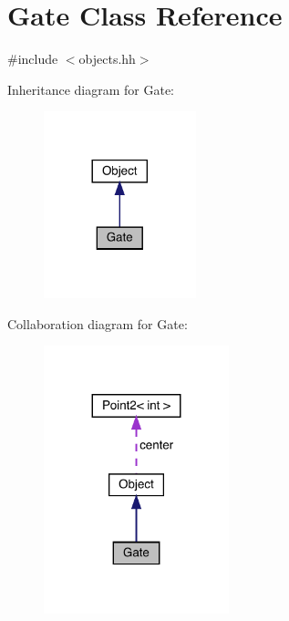 \hypertarget{class_gate}{}\section{Gate Class Reference}
\label{class_gate}


{\ttfamily \#include $<$objects.\+hh$>$}



Inheritance diagram for Gate\+:
\nopagebreak
\begin{figure}[H]
\begin{center}
\leavevmode
\includegraphics[width=125pt]{class_gate__inherit__graph}
\end{center}
\end{figure}


Collaboration diagram for Gate\+:
\nopagebreak
\begin{figure}[H]
\begin{center}
\leavevmode
\includegraphics[width=152pt]{class_gate__coll__graph}
\end{center}
\end{figure}
